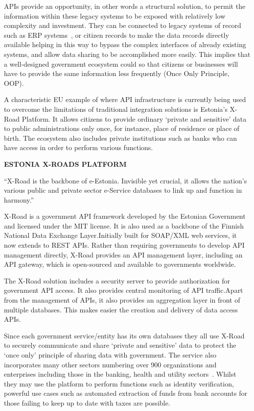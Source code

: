 APIs provide an opportunity, in other words a structural solution, to permit the
information within these legacy systems to be exposed with relatively low complexity
and investment. They can be connected to legacy systems of record such as ERP
systems~\citep{erp_integration}, or citizen records to make the data records directly available
helping in this way to bypass the complex interfaces of already existing systems,
and allow data sharing to be accomplished more easily. This implies that a
well-designed government ecosystem could so that citizens or businesses will have to
provide the same information less frequently (Once Only Principle, OOP).

A characteristic EU example of where API infrastructure is currently being used to overcome
the limitations of traditional integration solutions is Estonia’s X-Road Platform.
It allows citizens to provide ordinary ‘private and sensitive’ data to public administrations only once, for instance, place of residence or place of birth. The ecosystem also includes
private institutions such as banks who can have access in order to perform various
functions.

\textbf{ESTONIA X-ROADS PLATFORM}

“X-Road is the backbone of e-Estonia. Invisible yet crucial, it allows the
nation’s various public and private sector e-Service databases to link up and
function in harmony.”~\citep{x-road}

X-Road is a government API framework developed by the Estonian Government
and licensed under the MIT license. It is also used as a backbone of the Finnish
National Data Exchange Layer.Initially built for SOAP/XML web services, it now
extends to REST APIs. Rather than requiring governments to develop API management
directly, X-Road provides an API management layer, including an API gateway,
which is open-sourced and available to governments worldwide.~\citep{gov_transformation}

The X-Road solution includes a security server to provide authorization
for government API access. It also provides central monitoring of
API traffic.Apart from the management of APIs, it also provides an
aggregation layer in front of multiple databases. This makes easier the creation
and delivery of data access APIs.

Since each government service/entity has its own databases they all use X-Road
to securely communicate and share ‘private and sensitive’ data to protect the
‘once only’ principle of sharing data with government. The service also incorporates
many other sectors numbering over 900 organizations and enterprises including those
in the banking, health and utility sectors~\cite{x-road}. Whilst they may use the platform to
perform functions such as identity verification, powerful use cases such as automated extraction of funds from bank accounts for those failing to keep up to date with
taxes are possible.

